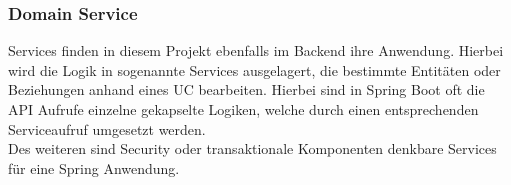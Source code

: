 			\subsubsection{Domain Service}
			Services finden in diesem Projekt ebenfalls im Backend ihre Anwendung. Hierbei wird die Logik in sogenannte Services ausgelagert, die bestimmte Entitäten oder Beziehungen anhand eines \ac{UC} bearbeiten. Hierbei sind in Spring Boot oft die \ac{API} Aufrufe einzelne gekapselte Logiken, welche durch einen entsprechenden Serviceaufruf umgesetzt werden. \\ 
			Des weiteren sind Security oder transaktionale Komponenten denkbare Services für eine Spring Anwendung.